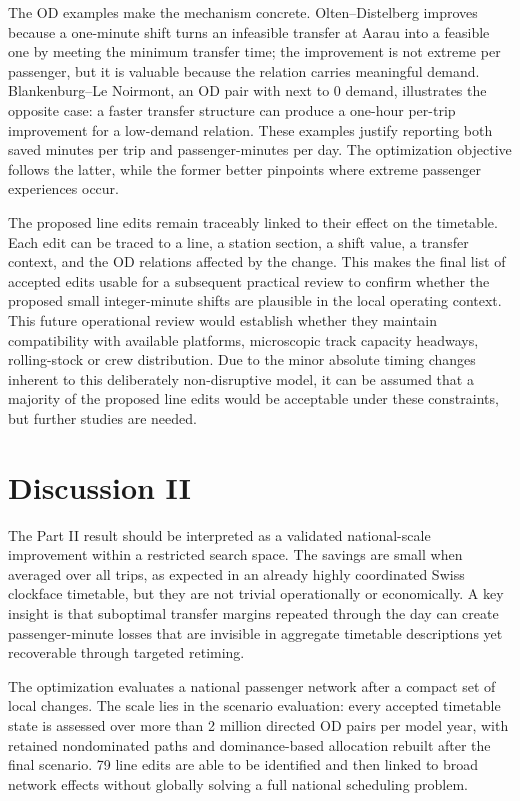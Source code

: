 \documentclass[conference]{IEEEtran}
\begin{document}
The OD examples make the mechanism concrete. Olten--Distelberg improves because a one-minute shift turns an infeasible transfer at Aarau into a feasible one by meeting the minimum transfer time; the improvement is not extreme per passenger, but it is valuable because the relation carries meaningful demand. Blankenburg--Le Noirmont, an OD pair with next to 0 demand, illustrates the opposite case: a faster transfer structure can produce a one-hour per-trip improvement for a low-demand relation. These examples justify reporting both saved minutes per trip and passenger-minutes per day. The optimization objective follows the latter, while the former better pinpoints where extreme passenger experiences occur.

The proposed line edits remain traceably linked to their effect on the timetable. Each edit can be traced to a line, a station section, a shift value, a transfer context, and the OD relations affected by the change. This makes the final list of accepted edits usable for a subsequent practical review to confirm whether the proposed small integer-minute shifts are plausible in the local operating context. This future operational review would establish whether they maintain compatibility with available platforms, microscopic track capacity headways, rolling-stock or crew distribution. Due to the minor absolute timing changes inherent to this deliberately non-disruptive model, it can be assumed that a majority of the proposed line edits would be acceptable under these constraints, but further studies are needed.

\section{Discussion II}
The Part II result should be interpreted as a validated national-scale improvement within a restricted search space. The savings are small when averaged over all trips, as expected in an already highly coordinated Swiss clockface timetable, but they are not trivial operationally or economically. A key insight is that suboptimal transfer margins repeated through the day can create passenger-minute losses that are invisible in aggregate timetable descriptions yet recoverable through targeted retiming.

The optimization evaluates a national passenger network after a compact set of local changes. The scale lies in the scenario evaluation: every accepted timetable state is assessed over more than 2 million directed OD pairs per model year, with retained nondominated paths and dominance-based allocation rebuilt after the final scenario. 79 line edits are able to be identified and then linked to broad network effects without globally solving a full national scheduling problem.
\end{document}

